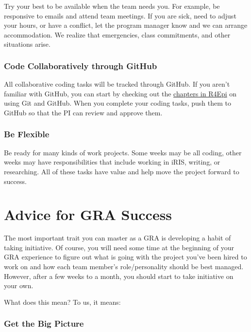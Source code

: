 \documentclass[
  letterpaper,
  DIV=11,
  numbers=noendperiod]{scrreprt}
\begin{document}
Try your best to be available when the team needs you. For example, be
responsive to emails and attend team meetings. If you are sick, need to
adjust your hours, or have a conflict, let the program manager know and
we can arrange accommodation. We realize that emergencies, class
commitments, and other situations arise.

\subsubsection{Code Collaboratively through
GitHub}\label{code-collaboratively-through-github}

All collaborative coding tasks will be tracked through GitHub. If you
aren't familiar with GitHub, you can start by checking out the
\href{https://www.r4epi.com/introduction-to-git-and-github.html}{chapters
in R4Epi} on using Git and GitHub. When you complete your coding tasks,
push them to GitHub so that the PI can review and approve them.

\subsubsection{Be Flexible}\label{be-flexible}

Be ready for many kinds of work projects. Some weeks may be all coding,
other weeks may have responsibilities that include working in iRIS,
writing, or researching. All of these tasks have value and help move the
project forward to success.

\section{Advice for GRA Success}\label{advice-for-gra-success}

The most important trait you can master as a GRA is developing a habit
of taking initiative. Of course, you will need some time at the
beginning of your GRA experience to figure out what is going with the
project you've been hired to work on and how each team member's
role/personality should be best managed. However, after a few weeks to a
month, you should start to take initiative on your own.

What does this mean? To us, it means:

\subsubsection{Get the Big Picture}\label{get-the-big-picture}
\end{document}
